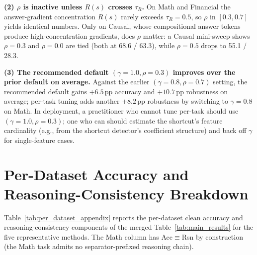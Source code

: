 \textbf{(2) $\rho$ is inactive unless $R(s)$ crosses $\tau_R$.} On Math and Financial the answer-gradient concentration $R(s)$ rarely exceeds $\tau_R{=}0.5$, so $\rho$ in $[0.3, 0.7]$ yields identical numbers. Only on Causal, whose compositional answer tokens produce high-concentration gradients, does $\rho$ matter: a Causal mini-sweep shows $\rho{=}0.3$ and $\rho{=}0.0$ are tied (both at 68.6 / 63.3), while $\rho{=}0.5$ drops to 55.1 / 28.3.

\textbf{(3) The recommended default $(\gamma{=}1.0, \rho{=}0.3)$ improves over the prior default on average.} Against the earlier $(\gamma{=}0.8, \rho{=}0.7)$ setting, the recommended default gains $+6.5$\,pp accuracy and $+10.7$\,pp robustness on average; per-task tuning adds another $+8.2$\,pp robustness by switching to $\gamma{=}0.8$ on Math. In deployment, a practitioner who cannot tune per-task should use $(\gamma{=}1.0, \rho{=}0.3)$; one who can should estimate the shortcut's feature cardinality (e.g., from the shortcut detector's coefficient structure) and back off $\gamma$ for single-feature cases.

\section{Per-Dataset Accuracy and Reasoning-Consistency Breakdown}
\label{sec:appendix_per_dataset}

Table~\ref{tab:per_dataset_appendix} reports the per-dataset clean accuracy and reasoning-consistency components of the merged Table~\ref{tab:main_results} for the five representative methods. The Math column has Acc$\equiv$Rsn by construction (the Math task admits no separator-prefixed reasoning chain).

